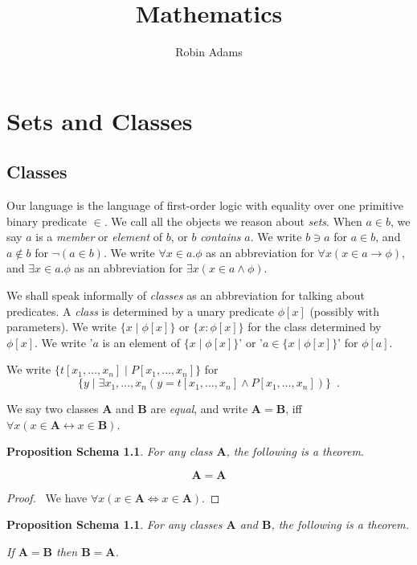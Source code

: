 \documentclass{book}
\title{Mathematics}
\author{Robin Adams}
\let\qed\relax
\newtheorem{props}[ax]{Proposition Schema}
\theoremstyle{definition}
\begin{document}
\maketitle
\tableofcontents

\chapter{Sets and Classes}

\section{Classes}

Our language is the language of first-order logic with equality over one primitive binary predicate $\in$. We call all the objects we reason about \emph{sets}. When $a \in b$, we say $a$ is a \emph{member} or \emph{element} of $b$, or $b$ \emph{contains} $a$. We write $b \ni a$ for $a \in b$, and $a \notin b$ for $\neg(a \in b)$. We write $\forall x \in a. \phi$ as an abbreviation for $\forall x(x \in a \rightarrow \phi)$, and $\exists x \in a. \phi$ as an abbreviation for $\exists x(x \in a \wedge \phi)$.

We shall speak informally of \emph{classes} as an abbreviation for talking about predicates. A \emph{class} is determined by a unary predicate $\phi[x]$ (possibly with parameters). We write $\{ x \mid \phi[x] \}$ or $\{ x : \phi[x] \}$ for the class determined by $\phi[x]$. We write '$a$ is an element of $\{x \mid \phi[x]\}$' or '$a \in \{x \mid \phi[x]\}$' for $\phi[a]$.

We write $\{t[x_1, \ldots, x_n] \mid P[x_1, \ldots, x_n] \}$ for 
\[ \{y \mid \exists x_1, \ldots, x_n (y = t[x_1, \ldots, x_n] \wedge P[x_1, \ldots, x_n]) \} \enspace . \]

We say two classes $\mathbf{A}$ and $\mathbf{B}$ are \emph{equal}, and write $\mathbf{A} = \mathbf{B}$, iff $\forall x (x \in \mathbf{A} \leftrightarrow x \in \mathbf{B})$.

\begin{props}
For any class $\mathbf{A}$, the following is a theorem.

\[ \mathbf{A} = \mathbf{A} \]
\end{props}

\begin{proof}
\pf\ We have $\forall x (x \in \mathbf{A} \Leftrightarrow x \in \mathbf{A})$. \qed
\end{proof}

\begin{props}
For any classes $\mathbf{A}$ and $\mathbf{B}$, the following is a theorem.

If $\mathbf{A} = \mathbf{B}$ then $\mathbf{B} = \mathbf{A}$.
\end{props}
\end{document}
